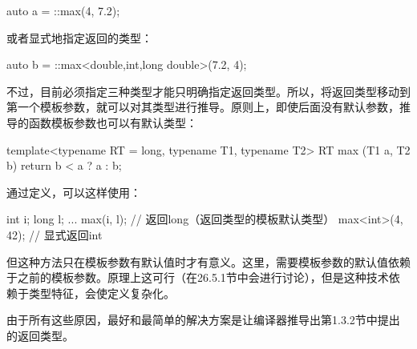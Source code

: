 \begin{cpp}
auto a = ::max(4, 7.2);
\end{cpp}

或者显式地指定返回的类型：

\begin{cpp}
auto b = ::max<double,int,long double>(7.2, 4);
\end{cpp}

不过，目前必须指定三种类型才能只明确指定返回类型。所以，将返回类型移动到第一个模板参数，就可以对其类型进行推导。原则上，即使后面没有默认参数，推导的函数模板参数也可以有默认类型：

\begin{cpp}
template<typename RT = long, typename T1, typename T2>
RT max (T1 a, T2 b) {
	return b < a ? a : b;
}
\end{cpp}

通过定义，可以这样使用：

\begin{cpp}
int i;
long l;
...
max(i, l); // 返回long（返回类型的模板默认类型）
max<int>(4, 42); // 显式返回int
\end{cpp}

但这种方法只在模板参数有默认值时才有意义。这里，需要模板参数的默认值依赖于之前的模板参数。原理上这可行（在26.5.1节中会进行讨论），但是这种技术依赖于类型特征，会使定义复杂化。

由于所有这些原因，最好和最简单的解决方案是让编译器推导出第1.3.2节中提出的返回类型。
